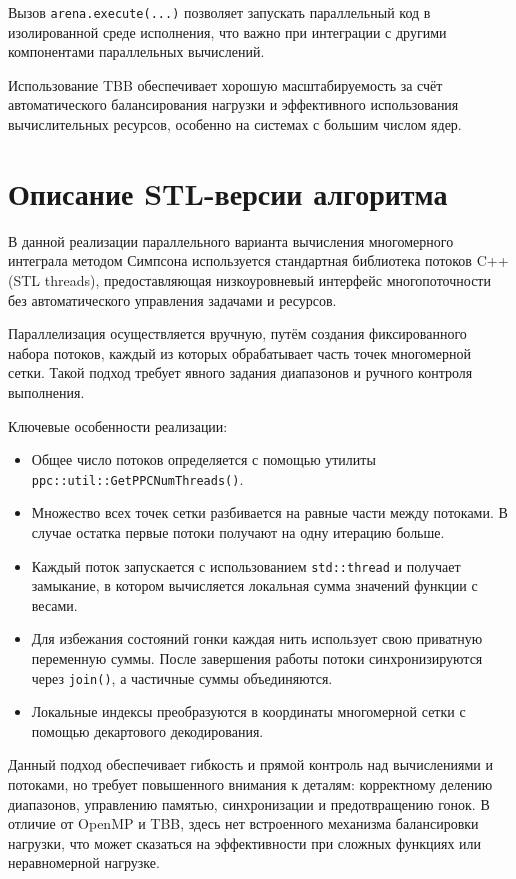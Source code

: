 \documentclass[a4paper,12pt]{article}
\begin{document}
Вызов \texttt{arena.execute(...)} позволяет запускать параллельный код в изолированной среде исполнения, что важно при интеграции с другими компонентами параллельных вычислений.

Использование TBB обеспечивает хорошую масштабируемость за счёт автоматического балансирования нагрузки и эффективного использования вычислительных ресурсов, особенно на системах с большим числом ядер.

\section{Описание STL-версии алгоритма}

В данной реализации параллельного варианта вычисления многомерного интеграла методом Симпсона используется стандартная библиотека потоков C++ (STL threads), предоставляющая низкоуровневый интерфейс многопоточности без автоматического управления задачами и ресурсов.

Параллелизация осуществляется вручную, путём создания фиксированного набора потоков, каждый из которых обрабатывает часть точек многомерной сетки. Такой подход требует явного задания диапазонов и ручного контроля выполнения.

Ключевые особенности реализации:

\begin{itemize}
    \item Общее число потоков определяется с помощью утилиты \texttt{ppc::util::GetPPCNumThreads()}.
    
    \item Множество всех точек сетки разбивается на равные части между потоками. В случае остатка первые потоки получают на одну итерацию больше.
    
    \item Каждый поток запускается с использованием \texttt{std::thread} и получает замыкание, в котором вычисляется локальная сумма значений функции с весами.
    
    \item Для избежания состояний гонки каждая нить использует свою приватную переменную суммы. После завершения работы потоки синхронизируются через \texttt{join()}, а частичные суммы объединяются.
    
    \item Локальные индексы преобразуются в координаты многомерной сетки с помощью декартового декодирования.
\end{itemize}

Данный подход обеспечивает гибкость и прямой контроль над вычислениями и потоками, но требует повышенного внимания к деталям: корректному делению диапазонов, управлению памятью, синхронизации и предотвращению гонок. В отличие от OpenMP и TBB, здесь нет встроенного механизма балансировки нагрузки, что может сказаться на эффективности при сложных функциях или неравномерной нагрузке.
\end{document}
